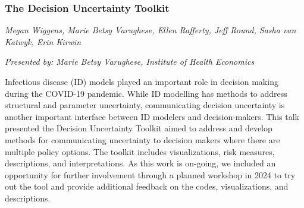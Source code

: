\subsubsection*{The Decision Uncertainty Toolkit}

\textit{Megan Wiggens, Marie Betsy Varughese, Ellen Rafferty, Jeff Round, Sasha van Katwyk, Erin Kirwin}

\textit{Presented by: Marie Betsy Varughese, Institute of Health Economics}

Infectious disease (ID) models played an important role in decision
making during the COVID-19 pandemic. While ID modelling has methods to
address structural and parameter uncertainty, communicating decision
uncertainty is another important interface between ID modelers and
decision-makers. This talk presented the Decision Uncertainty Toolkit
aimed to address and develop methods for communicating uncertainty to
decision makers where there are multiple policy options. The toolkit
includes visualizations, risk measures, descriptions, and
interpretations.  As this work is on-going, we included an opportunity
for further involvement through a planned workshop in 2024 to try out
the tool and provide additional feedback on the codes, visualizations,
and descriptions.
